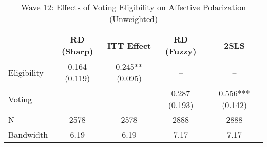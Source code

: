 \begin{table}[htbp]
\centering
\caption{Wave 12: Effects of Voting Eligibility on Affective Polarization (Unweighted)}
\label{tab:wave12_un}
\begin{tabular}{lcccc}
\hline
 & RD (Sharp) & ITT Effect & RD (Fuzzy) & 2SLS \\
\hline
Eligibility & 0.164 (0.119) & 0.245** (0.095) & -- & -- \\
Voting & -- & -- & 0.287 (0.193) & 0.556*** (0.142) \\
\hline
N & 2578 & 2578 & 2888 & 2888 \\
Bandwidth & 6.19 & 6.19 & 7.17 & 7.17 \\
\hline
\end{tabular}
\end{table}
